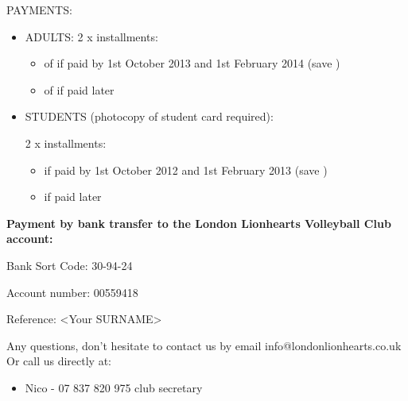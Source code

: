 PAYMENTS:
\begin{itemize}
\item ADULTS:
2 x installments:
\begin{itemize}
\item of  if paid by 1st October 2013 and 1st February 2014 (save )
  \item of  if paid later
\end{itemize}

\item STUDENTS (photocopy of student card required):

2 x installments:
\begin{itemize}
  \item {} if paid by 1st October 2012 and 1st February 2013 (save )
  \item {} if paid later
\end{itemize}
\end{itemize}

{\bfseries Payment by bank transfer to the London Lionhearts Volleyball Club account:}

Bank Sort Code: 30-94-24

Account number: 00559418

Reference: <Your SURNAME>

Any questions, don't hesitate to contact us by email info@londonlionhearts.co.uk
Or call us directly at:

\begin{itemize}
  \item Nico - 07 837 820 975	club secretary
\end{itemize}
\newpage


